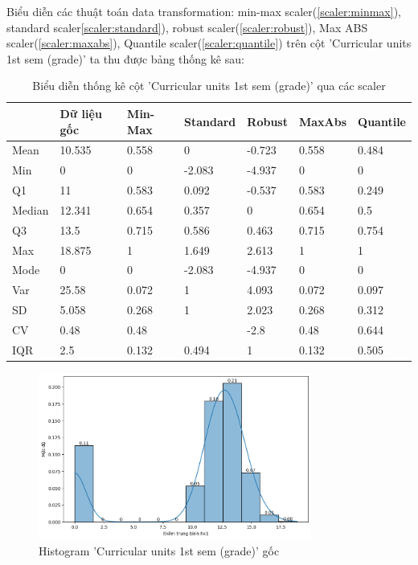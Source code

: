    Biểu diễn các thuật toán data transformation: min-max scaler(\ref{scaler:minmax}), standard scaler\ref{scaler:standard}), robust scaler(\ref{scaler:robust}), Max ABS scaler(\ref{scaler:maxabs}), Quantile scaler(\ref{scaler:quantile}) trên cột 'Curricular units 1st sem (grade)' ta thu được bảng thống kê sau:

    \begin{table}[htbp]
    \centering
    \caption{ Biểu diễn thống kê cột 'Curricular units 1st sem (grade)' qua các scaler}
    \label{tab:stat-dropout-scaler}
    \begin{tabular}{|l|l|l|l|l|l|l|}
        \hline
         & Dữ liệu gốc & Min-Max & Standard & Robust & MaxAbs & Quantile \\
        \hline
        Mean & 10.535 & 0.558 & 0 & -0.723 & 0.558 & 0.484 \\
        \hline
        Min & 0 & 0 & -2.083 & -4.937 & 0 & 0 \\
        \hline
        Q1 & 11 & 0.583 & 0.092 & -0.537 & 0.583 & 0.249 \\
        \hline
        Median & 12.341 & 0.654 & 0.357 & 0 & 0.654 & 0.5 \\
        \hline
        Q3 & 13.5 & 0.715 & 0.586 & 0.463 & 0.715 & 0.754 \\
        \hline
        Max & 18.875 & 1 & 1.649 & 2.613 & 1 & 1 \\
        \hline
        Mode & 0 & 0 & -2.083 & -4.937 & 0 & 0 \\
        \hline
        Var & 25.58 & 0.072 & 1 & 4.093 & 0.072 & 0.097 \\
        \hline
        SD & 5.058 & 0.268 & 1 & 2.023 & 0.268 & 0.312 \\
        \hline
        CV & 0.48 & 0.48 &  & -2.8 & 0.48 & 0.644 \\
        \hline
        IQR & 2.5 & 0.132 & 0.494 & 1 & 0.132 & 0.505 \\
        \hline
    \end{tabular}
    \end{table}

    \FloatBarrier

    \begin{figure}[htp]
        \centering
        \includegraphics[width=0.80\textwidth]{images/Table_Dropout_Grade_Norm.png}
        \caption{Histogram 'Curricular units 1st sem (grade)' gốc}
        \label{fig:Table_Dropout_Grade_Norm}
    \end{figure}

